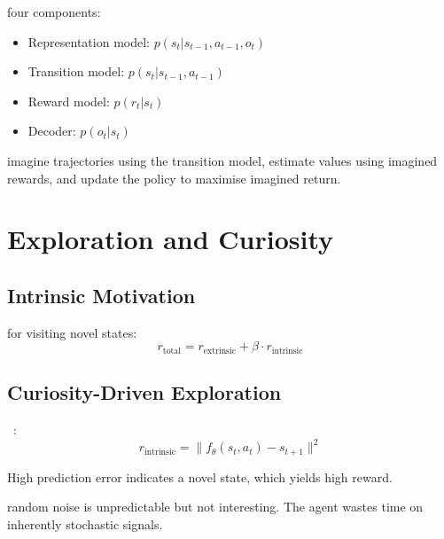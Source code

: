 
 four components:
\begin{itemize}
    \item Representation model: $p(s_t | s_{t-1}, a_{t-1}, o_t)$
    \item Transition model: $p(s_t | s_{t-1}, a_{t-1})$
    \item Reward model: $p(r_t | s_t)$
    \item Decoder: $p(o_t | s_t)$
\end{itemize}

 imagine trajectories using the transition model, estimate values using imagined rewards, and update the policy to maximise imagined return.


\section{Exploration and Curiosity}


\subsection{Intrinsic Motivation}

 for visiting novel states:
\begin{equation}
    r_{\text{total}} = r_{\text{extrinsic}} + \beta \cdot r_{\text{intrinsic}}
\end{equation}

\subsection{Curiosity-Driven Exploration}

~\cite{Pathak2017Curiosity}:
\begin{equation}
    r_{\text{intrinsic}} = \|f_\theta(s_t, a_t) - s_{t+1}\|^2
\end{equation}

High prediction error indicates a novel state, which yields high reward.

 random noise is unpredictable but not interesting. The agent wastes time on inherently stochastic signals.

